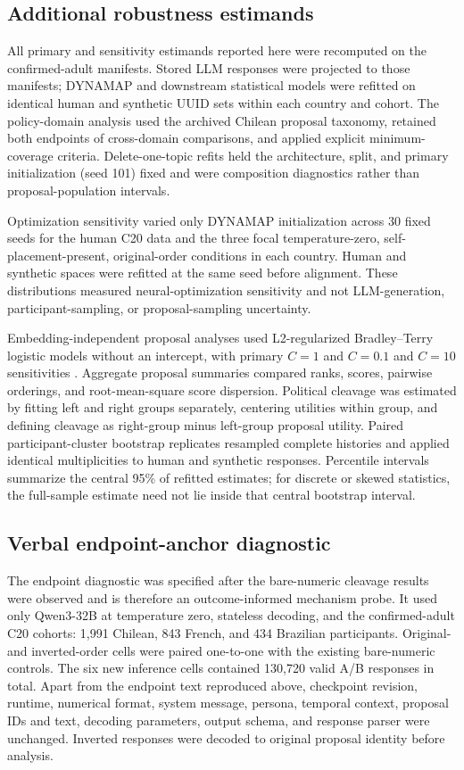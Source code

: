 \documentclass[unnumsec,webpdf,modern,large]{oup-authoring-template}
\begin{document}
\subsection{Additional robustness estimands}

All primary and sensitivity estimands reported here were recomputed on the confirmed-adult manifests. Stored LLM responses were projected to those manifests; DYNAMAP and downstream statistical models were refitted on identical human and synthetic UUID sets within each country and cohort. The policy-domain analysis used the archived Chilean proposal taxonomy, retained both endpoints of cross-domain comparisons, and applied explicit minimum-coverage criteria. Delete-one-topic refits held the architecture, split, and primary initialization (seed 101) fixed and were composition diagnostics rather than proposal-population intervals.

Optimization sensitivity varied only DYNAMAP initialization across 30 fixed seeds for the human C20 data and the three focal temperature-zero, self-placement-present, original-order conditions in each country. Human and synthetic spaces were refitted at the same seed before alignment. These distributions measured neural-optimization sensitivity and not LLM-generation, participant-sampling, or proposal-sampling uncertainty.

Embedding-independent proposal analyses used L2-regularized Bradley--Terry logistic models without an intercept, with primary $C=1$ and $C=0.1$ and $C=10$ sensitivities \citep{Bradley1952}. Aggregate proposal summaries compared ranks, scores, pairwise orderings, and root-mean-square score dispersion. Political cleavage was estimated by fitting left and right groups separately, centering utilities within group, and defining cleavage as right-group minus left-group proposal utility. Paired participant-cluster bootstrap replicates resampled complete histories and applied identical multiplicities to human and synthetic responses. Percentile intervals summarize the central 95\% of refitted estimates; for discrete or skewed statistics, the full-sample estimate need not lie inside that central bootstrap interval.

\subsection{Verbal endpoint-anchor diagnostic}

The endpoint diagnostic was specified after the bare-numeric cleavage results were observed and is therefore an outcome-informed mechanism probe. It used only Qwen3-32B at temperature zero, stateless decoding, and the confirmed-adult C20 cohorts: 1,991 Chilean, 843 French, and 434 Brazilian participants. Original- and inverted-order cells were paired one-to-one with the existing bare-numeric controls. The six new inference cells contained 130,720 valid A/B responses in total. Apart from the endpoint text reproduced above, checkpoint revision, runtime, numerical format, system message, persona, temporal context, proposal IDs and text, decoding parameters, output schema, and response parser were unchanged. Inverted responses were decoded to original proposal identity before analysis.
\end{document}
